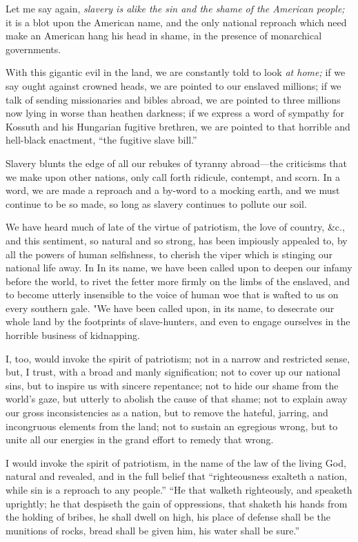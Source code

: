 Let me say again, \emph{slavery is alike the sin and the shame of the
American people;} it is a blot upon the American name, and the only
national reproach which need make an American hang his head in shame, in
the presence of monarchical governments.

With this gigantic evil in the land, we are constantly told to look
{}\emph{at home;} if we say ought against crowned heads, we are pointed
to our enslaved millions; if we talk of sending missionaries and bibles
abroad, we are pointed to three millions now lying in worse than heathen
darkness; if we express a word of sympathy for Kossuth and his Hungarian
fugitive brethren, we are pointed to that horrible and hell-black
enactment, ``the fugitive slave bill.''

Slavery blunts the edge of all our rebukes of tyranny abroad---the
criticisms that we make upon other nations, only call forth ridicule,
contempt, and scorn. In a word, we are made a reproach and a by-word to
a mocking earth, and we must continue to be so made, so long as slavery
continues to pollute our soil.

We have heard much of late of the virtue of patriotism, the love of
country, \&c., and this sentiment, so natural and so strong, has been
impiously appealed to, by all the powers of human selfishness, to
cherish the viper which is stinging our national life away. In In its
name, we have been called upon to deepen our infamy before the world, to
rivet the fetter more firmly on the limbs of the enslaved, and to become
utterly insensible to the voice of human woe that is wafted to us on
every southern gale. "We have been called upon, in its name, to
desecrate our whole land by the footprints of slave-hunters, and even to
engage ourselves in the horrible business of kidnapping.

I, too, would invoke the spirit of patriotism; not in a narrow and
restricted sense, but, I trust, with a broad and manly signification;
not to cover up our national sins, but to inspire us with sincere
repentance; not to hide our shame from the world's gaze, but utterly to
abolish the cause of that shame; not to explain away our gross
inconsistencies as a nation, but to remove the hateful, jarring, and
incongruous elements from the land; not to sustain an egregious wrong,
but to unite all our energies in the grand effort to remedy that wrong.

I would invoke the spirit of patriotism, in the name of the law of the
living God, natural and revealed, and in the full belief that
``righteousness exalteth a nation, while sin is a reproach to any
people.'' ``He that walketh righteously, and speaketh uprightly; he that
despiseth the gain of oppressions, that shaketh his hands from the
holding of bribes, he shall dwell on high, his place of defense shall be
the munitions of rocks, bread shall be given him, his water shall be
sure.''

